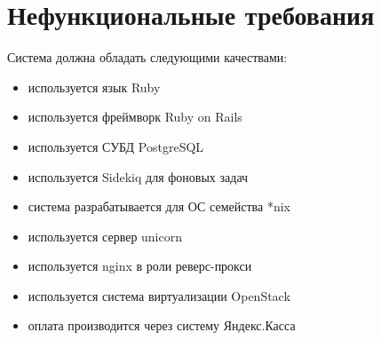 \section{Нефункциональные требования}\label{sec:ch2/sec3}
Система должна обладать следующими качествами:
\begin{itemize}
  \item используется язык Ruby
  \item используется фреймворк Ruby on Rails
  \item используется СУБД PostgreSQL
  \item используется Sidekiq для фоновых задач
  \item система разрабатывается для ОС семейства *nix
  \item используется сервер unicorn
  \item используется nginx в роли реверс-прокси
  \item используется система виртуализации OpenStack
  \item оплата производится через систему Яндекс.Касса
\end{itemize}
